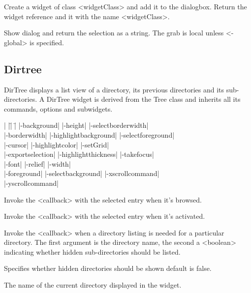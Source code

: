 \vskip5pt

\begin{enum}{1cm}

Create a widget of class <widgetClass> and add it to the dialogbox.
Return the widget reference and  it with the name
<widgetClass>.

 Show dialog and return the
selection as a string.  The grab is local unless <-global> is specified.

\end{enum}

\subsection*{Dirtree}
DirTree displays a list view of a directory, its previous directories and 
its sub-directories. 
A DirTree widget is derived from the Tree class and
inherits all its commands, options and subwidgets.
\vskip5pt
\vskip5pt
\vspace{-4pt}

\begin{tabbing}
|                   |\=|                     |\= \kill
|-background|        \> |-height|             \> |-selectborderwidth| \\
|-borderwidth|       \> |-highlightbackground| \> |-selectforeground| \\
|-cursor|	     \> |-highlightcolor|     \> |-setGrid| \\         
|-exportselection|   \> |-highlightthickness| \> |-takefocus| \\
|-font|              \> |-relief|             \> |-width| \\           
|-foreground|        \> |-selectbackground|   \> |-xscrollcommand| \\  
\> \> |-yscrollcommand| \\  
\end{tabbing}

\vskip5pt
\begin{enum}{1cm}

 Invoke the <callback> with the selected entry
when it's browsed.

 Invoke the <callback> with the selected entry
when it's activated.

 Invoke the <callback> 
when a directory listing is needed for a particular directory.
The first argument is the directory name, the second a <boolean>
indicating whether hidden sub-directories should be listed.

Specifies whether hidden directories should be shown default is false.

The name of the current directory displayed in the widget.

\end{enum}

